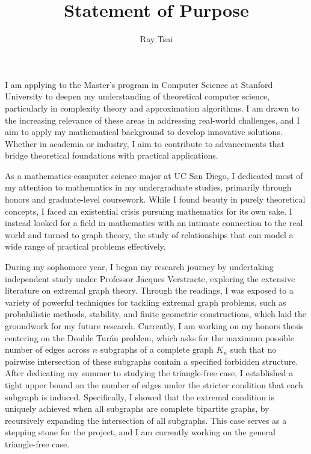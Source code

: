 \documentclass[12pt]{article}
\title{Statement of Purpose}
\author{Ray Tsai}
\date{}
\begin{document}
\maketitle

\vspace{-0.25in}

I am applying to the Master's program in Computer Science at Stanford University to deepen my
understanding of theoretical computer science, particularly in complexity theory and approximation
algorithms. I am drawn to the increasing relevance of these areas in addressing real-world
challenges, and I aim to apply my mathematical background to develop innovative solutions. Whether
in academia or industry, I aim to contribute to advancements that bridge theoretical foundations
with practical applications.

As a mathematics-computer science major at UC San Diego, I dedicated most of my attention to
mathematics in my undergraduate studies, primarily through honors and graduate-level coursework.
While I found beauty in purely theoretical concepts, I faced an existential crisis pursuing
mathematics for its own sake. I instead looked for a field in mathematics with an intimate
connection to the real world and turned to graph theory, the study of relationships that can model a
wide range of practical problems effectively.

During my sophomore year, I began my research journey by undertaking independent study under
Professor Jacques Verstraete, exploring the extensive literature on extremal graph theory. Through
the readings, I was exposed to a variety of powerful techniques for tackling extremal graph
problems, such as probabilistic methods, stability, and finite geometric constructions, which laid
the groundwork for my future research. Currently, I am working on my honors thesis centering on the
Double Turán problem, which asks for the maximum possible number of edges across $n$ subgraphs of a
complete graph $K_n$ such that no pairwise intersection of these subgraphs contain a specified
forbidden structure. After dedicating my summer to studying the triangle-free case, I established a
tight upper bound on the number of edges under the stricter condition that each subgraph is induced.
Specifically, I showed that the extremal condition is uniquely achieved when all subgraphs are
complete bipartite graphs, by recursively expanding the intersection of all subgraphs. This case
serves as a stepping stone for the project, and I am currently working on the general triangle-free
case. 
\end{document}
